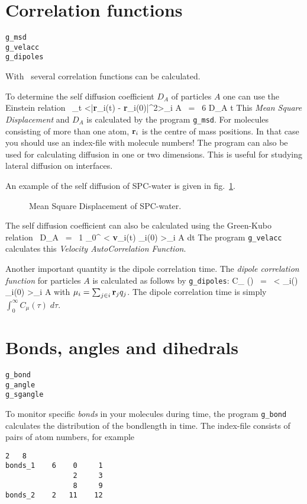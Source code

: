 \section{Correlation functions}
\label{sec:corr}
\begin{verbatim}
g_msd
g_velacc
g_dipoles
\end{verbatim}
With \gromacs~several correlation functions can be calculated. 

To determine the self diffusion coefficient $D_A$ of particles $A$ one
can use the Einstein relation~\cite{Allen87} \beq \lim_{t \rightarrow
\infty} <|{\bf r}_i(t) - {\bf r}_i(0)|^2>_{i \in A} ~=~ 6 D_A t \eeq
This {\em Mean Square Displacement} and $D_A$ is calculated by the
program {\tt g\_msd}. For molecules consisting of more than one atom,
${\bf r}_i$ is the centre of mass positions. In that case you should
use an index-file with molecule numbers! The program can also be used
for calculating diffusion in one or two dimensions. This is useful for
studying lateral diffusion on interfaces. 

An example of the self diffusion of SPC-water is given in
fig.~\ref{fig:msdwater}.
%
\begin{figure}[hbtp]
\centerline{
{}}
\caption{Mean Square Displacement of SPC-water.}
\label{fig:msdwater}
\end{figure}
%

The self diffusion coefficient can also be calculated using the Green-Kubo 
relation~\cite{Allen87}
\beq
D_A ~=~ {1} \int_0^{\infty} < {\bf v}_i(t) _i(0) >_{i \in A} \; dt
\eeq
The program {\tt g\_velacc} calculates this {\em Velocity AutoCorrelation 
Function}.

Another important quantity is the dipole correlation time. The {\em dipole 
correlation function} for particles $A$ is calculated as follows by {\tt g\_dipoles}:
\beq
C_{\mu} (\tau) ~=~ < {\bf \mu}_i(\tau) \cdot {\bf \mu}_i(0) >_{i \in A}
\eeq
with ${\bf \mu}_i = \sum_{j \in i} {\bf r}_j q_j$. The dipole correlation time is simply $\int_0^{\infty} C_{\mu} (\tau) \; d\tau$.
% 
% 
\section{Bonds, angles and dihedrals}
\label{sec:bad}
\begin{verbatim}
g_bond
g_angle
g_sgangle
\end{verbatim}
To monitor specific {\em bonds} in your molecules during time, the program 
{\tt g\_bond} calculates the distribution of the bondlength in time. 
The index-file consists of pairs of atom numbers, for example
\begin{verbatim}
2   8
bonds_1    6    0     1
                2     3
                8     9
bonds_2    2   11    12
\end{verbatim}

